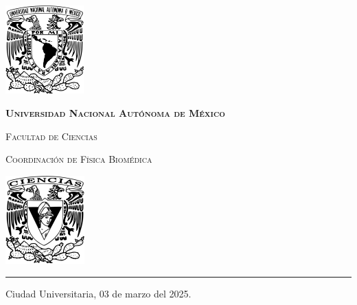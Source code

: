 \documentclass[9pt,letterpaper]{article}
\begin{document}
	
	
	\begin{center}
		\begin{minipage}{3cm}
			\begin{center}
				\includegraphics[height=3.4cm]{../Figuras/Logo_UNAM (1)}
			\end{center}
		\end{minipage}\hfill
		\begin{minipage}{10cm}
			\begin{center}
				{\scshape\LARGE \textbf{Universidad Nacional Autónoma de México} \par}
				{\scshape\Large Facultad de Ciencias\par}
				{\scshape\Large Coordinación de Física Biomédica\par}
			\end{center}
		\end{minipage}\hfill
		\begin{minipage}{3cm}
			\begin{center}
				\includegraphics[height=3.4cm]{../Figuras/Logo_FC (1)}
			\end{center}
		\end{minipage}
	\end{center}
	
	\rule{17cm}{0.1mm}
	
	\hspace{0.5cm}
	
	\parbox{\textwidth}{\raggedleft Ciudad Universitaria, 03 de marzo del 2025.}
	
	\hspace{1cm}
	
	\vspace{0.5cm}
	
\end{document}
